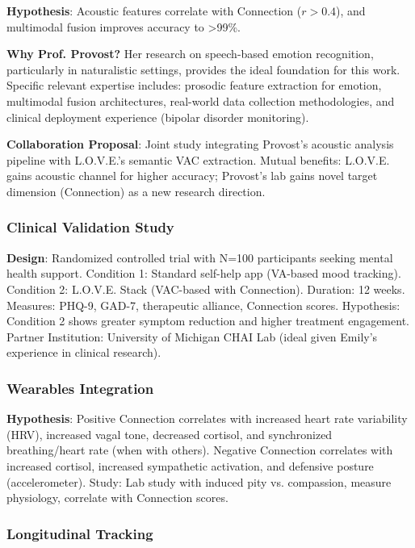 \textbf{Hypothesis}: Acoustic features correlate with Connection ($r > 0.4$), and multimodal fusion improves accuracy to >99\%.

\textbf{Why Prof. Provost?} Her research on speech-based emotion recognition, particularly in naturalistic settings, provides the ideal foundation for this work. Specific relevant expertise includes: prosodic feature extraction for emotion, multimodal fusion architectures, real-world data collection methodologies, and clinical deployment experience (bipolar disorder monitoring).

\textbf{Collaboration Proposal}: Joint study integrating Provost's acoustic analysis pipeline with L.O.V.E.'s semantic VAC extraction. Mutual benefits: L.O.V.E. gains acoustic channel for higher accuracy; Provost's lab gains novel target dimension (Connection) as a new research direction.

\subsubsection{Clinical Validation Study}

\textbf{Design}: Randomized controlled trial with N=100 participants seeking mental health support. Condition 1: Standard self-help app (VA-based mood tracking). Condition 2: L.O.V.E. Stack (VAC-based with Connection). Duration: 12 weeks. Measures: PHQ-9, GAD-7, therapeutic alliance, Connection scores. Hypothesis: Condition 2 shows greater symptom reduction and higher treatment engagement. Partner Institution: University of Michigan CHAI Lab (ideal given Emily's experience in clinical research).

\subsubsection{Wearables Integration}

\textbf{Hypothesis}: Positive Connection correlates with increased heart rate variability (HRV), increased vagal tone, decreased cortisol, and synchronized breathing/heart rate (when with others). Negative Connection correlates with increased cortisol, increased sympathetic activation, and defensive posture (accelerometer). Study: Lab study with induced pity vs. compassion, measure physiology, correlate with Connection scores.

\subsubsection{Longitudinal Tracking}

